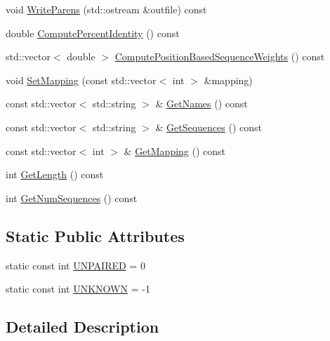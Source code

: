 \begin{DoxyCompactItemize}
void \hyperlink{class_c_o_n_t_r_a_l_i_g_n_1_1_s_struct_a6b12fb398bcf932a1cc414b8f6da0648}{Write\+Parens} (std\+::ostream \&outfile) const 
\item 
double \hyperlink{class_c_o_n_t_r_a_l_i_g_n_1_1_s_struct_abcab3b62ee1c201279042de4fdf3bd3f}{Compute\+Percent\+Identity} () const 
\item 
std\+::vector$<$ double $>$ \hyperlink{class_c_o_n_t_r_a_l_i_g_n_1_1_s_struct_acdb93561a8330235e2bf0dae94c3d1f2}{Compute\+Position\+Based\+Sequence\+Weights} () const 
\item 
void \hyperlink{class_c_o_n_t_r_a_l_i_g_n_1_1_s_struct_a9a2bebbc61b1ff49a5599c8d72930809}{Set\+Mapping} (const std\+::vector$<$ int $>$ \&mapping)
\item 
const std\+::vector$<$ std\+::string $>$ \& \hyperlink{class_c_o_n_t_r_a_l_i_g_n_1_1_s_struct_a78fb1ed337b35efb124726902f5b684f}{Get\+Names} () const 
\item 
const std\+::vector$<$ std\+::string $>$ \& \hyperlink{class_c_o_n_t_r_a_l_i_g_n_1_1_s_struct_a43155b630769a016f444a5bb8dadf1ee}{Get\+Sequences} () const 
\item 
const std\+::vector$<$ int $>$ \& \hyperlink{class_c_o_n_t_r_a_l_i_g_n_1_1_s_struct_a4395e3ed2963400780ec7e59fdb9a336}{Get\+Mapping} () const 
\item 
int \hyperlink{class_c_o_n_t_r_a_l_i_g_n_1_1_s_struct_aceffcc0e00015eff2c5e1ef419a811e0}{Get\+Length} () const 
\item 
int \hyperlink{class_c_o_n_t_r_a_l_i_g_n_1_1_s_struct_a44cfdfe184b885fc6fd9402f9d66e742}{Get\+Num\+Sequences} () const 
\end{DoxyCompactItemize}
\subsection*{Static Public Attributes}
\begin{DoxyCompactItemize}
\item 
static const int \hyperlink{class_c_o_n_t_r_a_l_i_g_n_1_1_s_struct_a65509ae93cf1bcb551d780653c721a56}{U\+N\+P\+A\+I\+R\+E\+D} = 0
\item 
static const int \hyperlink{class_c_o_n_t_r_a_l_i_g_n_1_1_s_struct_a5158068f84b0eea15da8d3f43572581a}{U\+N\+K\+N\+O\+W\+N} = -\/1
\end{DoxyCompactItemize}


\subsection{Detailed Description}


